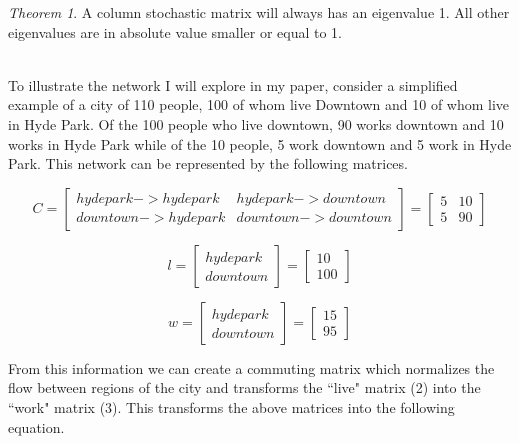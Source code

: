 \documentclass{article}
\theoremstyle{definition}
\theoremstyle{remark}
\newtheorem{theorem}{Theorem}
\begin{document}
\begin{theorem}
A column stochastic matrix will always has an eigenvalue 1. All other eigenvalues are in absolute
value smaller or equal to 1.
\end{theorem}

\\ 

To illustrate the network I will explore in my paper, consider a simplified example of a city of 110 people, 100 of whom live Downtown and 10 of whom live in Hyde Park.  Of the 100 people who live downtown, 90 works downtown and 10 works in Hyde Park while of the 10 people, 5 work downtown and 5 work in Hyde Park.  This network can be represented by the following matrices. 

\begin{equation}
      C
   =
  \begin{bmatrix}
    hyde park->hyde park  & hyde park->downtown\\
    downtown->hyde park  & downtown->downtown
  \end{bmatrix} = 
  \begin{bmatrix}
    5 & 10\\
    5 & 90 
  \end{bmatrix}
\end{equation}

\begin{equation}
      l
   =
  \begin{bmatrix}
    hyde park\\
    downtown
    
  \end{bmatrix} = 
  \begin{bmatrix}
    10\\
    100 
  \end{bmatrix}
\end{equation}

\begin{equation}
      w
   =
  \begin{bmatrix}
    hyde park\\
    downtown
  \end{bmatrix} = 
  \begin{bmatrix}
    15\\
    95
  \end{bmatrix}
\end{equation}

From this information we can create a commuting matrix which normalizes the flow between regions of the city and transforms the ``live" matrix (2) into the ``work" matrix (3).  This transforms the above matrices into the following equation.
\end{document}
